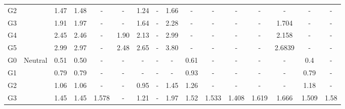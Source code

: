 \begin{landscape}
\begin{table}[t]
{\begin{tabular}{cccccccccccccccc}
G2  &                          & 1.47  & 1.48      &       -           & -                         &   1.24                &-                      &   1.66                &   -                   &-                          &-                      &-                      &   -               &   -               &   -\\
G3     &                          & 1.91  & 1.97      &       -           & -                         &   1.64                &-                      &   2.28                &   -                   &-                          &-                      &-                      &   1.704           &   -               &   -\\
G4    &                          & 2.45  & 2.46      &       -           & 1.90                      &   2.13                &-                      &   2.99                &   -                   &-                          &-                      &-                      &   2.158           &   -               &   -\\
G5   &                          & 2.99  & 2.97      &       -           & 2.48                      &   2.65                &-                      &   3.80                &   -                   &-                          &-                      &-                      &   2.6839          &   -               &   -\\
\hline
G0     & \multirow{6}{*}{Neutral} & 0.51  & 0.50      &       -           & -                         &   -                   &-                      &   -                   & 0.61                  &-                          &-                      &-                      &       -           &   0.4             &   -   \\
G1    &                          & 0.79  & 0.79      &       -           & -                         &   -                   &-                      &   -                   & 0.93                  &-                          &-                      &-                      &       -           &   0.79            &   -       \\
G2   &                          & 1.06  & 1.06      &       -           & -                         &   0.95                &-                      &   1.45                & 1.26                  &-                          &-                      &-                      &       -           &   1.18            &   -       \\
G3  &                          & 1.45  & 1.45      &   1.578           & -                         &   1.21                &-                      &   1.97                & 1.52                  &1.533                      &1.408                  &1.619                  &   1.666           &   1.509           &   1.58    \\

\end{tabular}}
\end{table}
\end{landscape}
